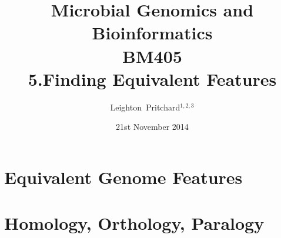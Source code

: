 

%



\title[Microbial Genomics and Bioinformatics: 5.Equivalent Features] %
{Microbial Genomics and \\ Bioinformatics \\
BM405 \\
5.Finding Equivalent Features}
\author[Pritchard] %
{Leighton~Pritchard$^{1,2,3}$}
\date[21st November 2014] %
{21st November 2014}
\subject{Bioinformatics, Genomics, Bacteria, Sequencing, Microbiology, Microbes}





\frame[plain]{\titlepage}



\section{Equivalent Genome Features}


\section{Homology, Orthology, Paralogy}





